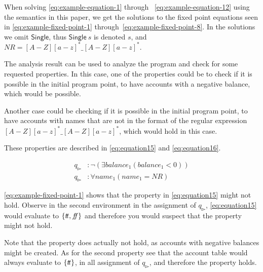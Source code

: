 When solving \autoref{eq:example-equation-1} through ~\autoref{eq:example-equation-12} using the semantics in this paper, we get the solutions to the fixed point equations seen in \autoref{eq:example-fixed-point-1} through~\ref{eq:example-fixed-point-8}.
In the solutions we omit $\mathsf{Single}$, thus $\mathsf{Single} \ s$ is denoted $s$, and $NR =  [A-Z][a-z]^*\_[A-Z][a-z]^*$.



The analysis result can be used to analyze the program and check for some requested properties.
In this case, one of the properties could be to check if it is possible in the initial program point, to have accounts with a negative balance, which would be possible.

Another case could be checking if it is possible in the initial program point, to have accounts with names that are not in the format of the regular expression $[A-Z][a-z]^*\_ [A-Z][a-z]^*$, which would hold in this case.

These properties are described in \autoref{eq:equation15} and \autoref{eq:equation16}.

\begin{align}
     q_{\whitepointerright}&:\neg(\exists balance_1(balance_1<0))\label{eq:equation15}  \\
     q_{\whitepointerright}&:\forall name_1(name_1 = NR) \label{eq:equation16}
\end{align}

\autoref{eq:example-fixed-point-1} shows that the property in \autoref{eq:equation15} might not hold.
Observe in the second environment in the assignment of $q_{\whitepointerright}$, \autoref{eq:equation15} would evaluate to $\{t\!t, f\!\!f\}$ and therefore you would suspect that the property might not hold.

Note that the property does actually not hold, as accounts with negative balances might be created.
As for the second property see that the account table would always evaluate to $\{t\!t\}$, in all assignment of $q_{\whitepointerright}$, and therefore the property holds.